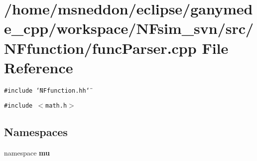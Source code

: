 \section{/home/msneddon/eclipse/ganymede\_\-cpp/workspace/NFsim\_\-svn/src/NFfunction/funcParser.cpp File Reference}
\label{funcParser_8cpp}


{\tt \#include \char`\"{}NFfunction.hh\char`\"{}}\par
{\tt \#include $<$math.h$>$}\par
\subsection*{Namespaces}
\begin{CompactItemize}
\item 
namespace {\bf mu}
\end{CompactItemize}

